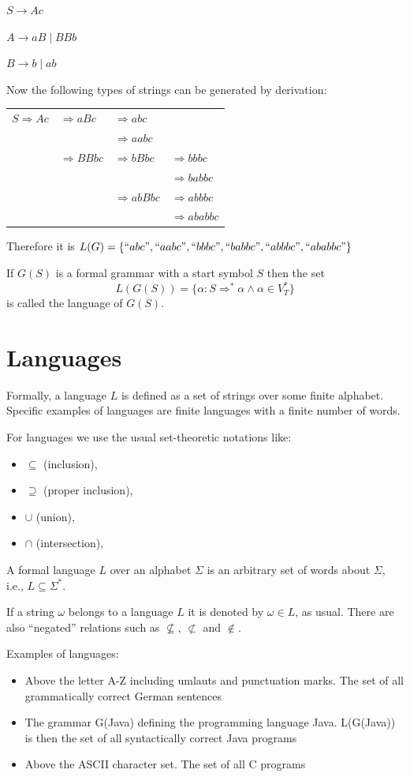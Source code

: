 $S \rightarrow Ac$

$A \rightarrow aB \mid BBb$

$B \rightarrow b \mid ab$

Now the following types of strings can be generated by derivation:

\begin{tabular}{llll}
$S \Rightarrow Ac$ & $\Rightarrow aBc$ & $\Rightarrow abc$ & \\
 & & $\Rightarrow aabc$ & \\
 & $\Rightarrow BBbc$ & $\Rightarrow bBbc$ & $\Rightarrow bbbc$ \\
 & & & $\Rightarrow babbc$ \\
 & & $\Rightarrow abBbc$ & $\Rightarrow abbbc$ \\
 & & & $\Rightarrow ababbc$ \\
\end{tabular}

Therefore it is $L(G) = \{``abc", ``aabc", ``bbbc", ``babbc", ``abbbc", ``ababbc"\}$

If $G(S)$ is a formal grammar with a start symbol $S$ then the set $$L(G(S)) = \{\alpha : S \Rightarrow^* \alpha \wedge \alpha \in V^{*}_{T}\}$$
is called the language of $G(S)$.

\section{Languages}
Formally, a language $L$ is defined as a set of strings over some finite alphabet. Specific examples of languages are finite languages with a finite number of words.

For languages we use the usual set-theoretic notations like:
\begin{itemize}
\item $\subseteq$ (inclusion), 
\item $\supseteq$ (proper inclusion), 
\item $\cup$ (union), 
\item $\cap$ (intersection), 
\end{itemize}
A formal language $L$ over an alphabet $\Sigma$ is an arbitrary set of words about $\Sigma$, i.e., $L \subseteq \Sigma^*$.

If a string $\omega$ belongs to a language $L$ it is denoted by $\omega \in L$, as usual. There are also ``negated'' relations such as $\not\subseteq$, $\not\subset$ and $\not\in$.

Examples of languages:
\begin{itemize}
\item Above the letter A-Z including umlauts and punctuation marks. The set of all
grammatically correct German sentences
\item The grammar G(Java) defining the programming language Java. L(G(Java)) is then the set of all syntactically correct Java
programs
\item Above the ASCII character set. The set of all C programs
\end{itemize}

